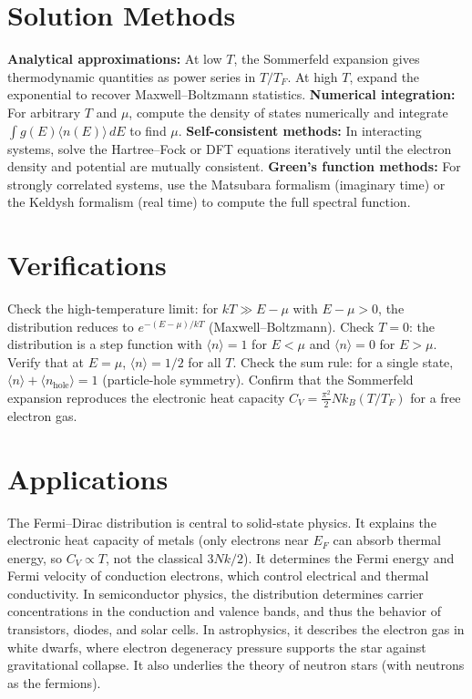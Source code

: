 \documentclass[11pt,openright]{book}
\begin{document}
\section*{Solution Methods}

\textbf{Analytical approximations:} At low $T$, the Sommerfeld expansion gives thermodynamic quantities as power series in $T/T_F$. At high $T$, expand the exponential to recover Maxwell--Boltzmann statistics. \textbf{Numerical integration:} For arbitrary $T$ and $\mu$, compute the density of states numerically and integrate $\int g(E)\langle n(E)\rangle\,dE$ to find $\mu$. \textbf{Self-consistent methods:} In interacting systems, solve the Hartree--Fock or DFT equations iteratively until the electron density and potential are mutually consistent. \textbf{Green's function methods:} For strongly correlated systems, use the Matsubara formalism (imaginary time) or the Keldysh formalism (real time) to compute the full spectral function.
\section*{Verifications}

Check the high-temperature limit: for $kT \gg E - \mu$ with $E - \mu > 0$, the distribution reduces to $e^{-(E-\mu)/kT}$ (Maxwell--Boltzmann). Check $T = 0$: the distribution is a step function with $\langle n \rangle = 1$ for $E < \mu$ and $\langle n \rangle = 0$ for $E > \mu$. Verify that at $E = \mu$, $\langle n \rangle = 1/2$ for all $T$. Check the sum rule: for a single state, $\langle n \rangle + \langle n_{\text{hole}} \rangle = 1$ (particle-hole symmetry). Confirm that the Sommerfeld expansion reproduces the electronic heat capacity $C_V = \frac{\pi^2}{2}Nk_B(T/T_F)$ for a free electron gas.
\section*{Applications}

The Fermi--Dirac distribution is central to solid-state physics. It explains the electronic heat capacity of metals (only electrons near $E_F$ can absorb thermal energy, so $C_V \propto T$, not the classical $3Nk/2$). It determines the Fermi energy and Fermi velocity of conduction electrons, which control electrical and thermal conductivity. In semiconductor physics, the distribution determines carrier concentrations in the conduction and valence bands, and thus the behavior of transistors, diodes, and solar cells. In astrophysics, it describes the electron gas in white dwarfs, where electron degeneracy pressure supports the star against gravitational collapse. It also underlies the theory of neutron stars (with neutrons as the fermions).
\end{document}

